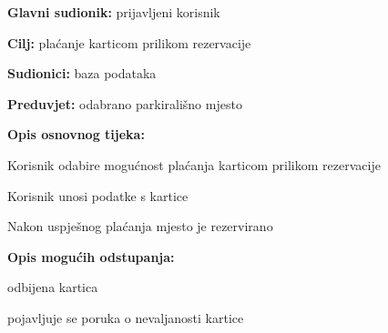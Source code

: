 					
					
					\noindent {}
					\begin{packed_item}
						
						\item \textbf{Glavni sudionik: }prijavljeni korisnik
						\item  \textbf{Cilj:} plaćanje karticom prilikom rezervacije
						\item  \textbf{Sudionici:} baza podataka
						\item  \textbf{Preduvjet:} odabrano parkirališno mjesto
						\item  \textbf{Opis osnovnog tijeka:}
						
						\item[] \begin{packed_enum}
							
							
							\item  Korisnik odabire mogućnost plaćanja karticom prilikom rezervacije
							\item Korisnik unosi podatke s kartice
							\item Nakon uspješnog plaćanja mjesto je rezervirano
						\end{packed_enum}
						
						\item  \textbf{Opis mogućih odstupanja:}
						
						\item[] \begin{packed_item}
							
							\item[2.a] odbijena kartica
							\item[] \begin{packed_enum}
								
								\item pojavljuje se poruka o nevaljanosti kartice
								
							\end{packed_enum}

							
						\end{packed_item}
					\end{packed_item}
					
